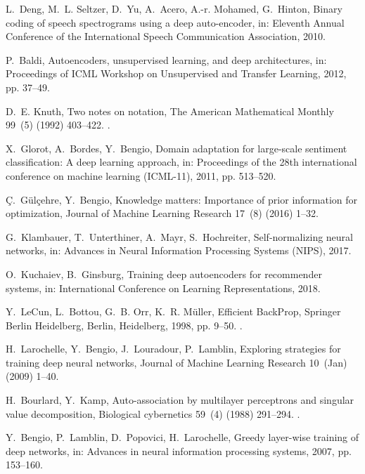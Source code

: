 \documentclass[preprint,5p,compress]{elsarticle}
\begin{document}
\begin{thebibliography}{100}
L.~Deng, M.~L. Seltzer, D.~Yu, A.~Acero, A.-r. Mohamed, G.~Hinton, Binary
  coding of speech spectrograms using a deep auto-encoder, in: Eleventh Annual
  Conference of the International Speech Communication Association, 2010.

P.~Baldi, Autoencoders, unsupervised learning, and deep architectures, in:
  Proceedings of {ICML} Workshop on Unsupervised and Transfer Learning, 2012,
  pp. 37--49.

D.~E. Knuth, Two notes on notation, The American Mathematical Monthly 99~(5)
  (1992) 403--422.
\newblock \href {http://dx.doi.org/10.2307/2325085}
  {}.

X.~Glorot, A.~Bordes, Y.~Bengio, Domain adaptation for large-scale sentiment
  classification: A deep learning approach, in: Proceedings of the 28th
  international conference on machine learning (ICML-11), 2011, pp. 513--520.

{\c{C}}.~G{\"u}l{\c{c}}ehre, Y.~Bengio, Knowledge matters: Importance of prior
  information for optimization, Journal of Machine Learning Research 17~(8)
  (2016) 1--32.

G.~Klambauer, T.~Unterthiner, A.~Mayr, S.~Hochreiter, Self-normalizing neural
  networks, in: Advances in Neural Information Processing Systems (NIPS), 2017.

O.~Kuchaiev, B.~Ginsburg, Training deep autoencoders for recommender systems,
  in: International Conference on Learning Representations, 2018.

Y.~LeCun, L.~Bottou, G.~B. Orr, K.~R. M{\"u}ller, Efficient BackProp, Springer
  Berlin Heidelberg, Berlin, Heidelberg, 1998, pp. 9--50.
\newblock \href {http://dx.doi.org/10.1007/3-540-49430-8\_2}
  {}.

H.~Larochelle, Y.~Bengio, J.~Louradour, P.~Lamblin, Exploring strategies for
  training deep neural networks, Journal of Machine Learning Research 10~(Jan)
  (2009) 1--40.

H.~Bourlard, Y.~Kamp, Auto-association by multilayer perceptrons and singular
  value decomposition, Biological cybernetics 59~(4) (1988) 291--294.
\newblock \href {http://dx.doi.org/10.1007/BF00332918}
  {}.

Y.~Bengio, P.~Lamblin, D.~Popovici, H.~Larochelle, Greedy layer-wise training
  of deep networks, in: Advances in neural information processing systems,
  2007, pp. 153--160.


\end{thebibliography}
\end{document}
